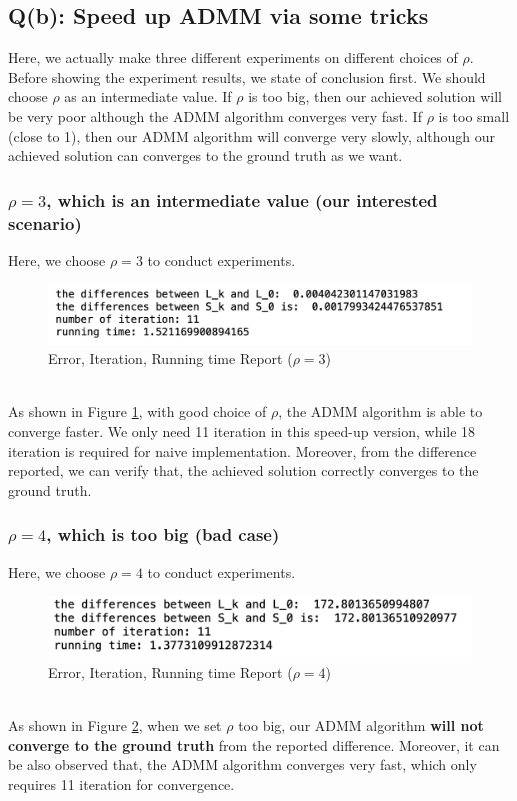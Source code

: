 \documentclass{article}
\begin{document}
\subsection{Q(b): Speed up ADMM via some tricks}
Here, we actually make three different experiments on different choices of $\rho$. Before showing the experiment results, we state of conclusion first. We should choose $\rho$ as an intermediate value. If $\rho$ is too big, then our achieved solution will be very poor although the ADMM algorithm converges very fast. If $\rho$ is too small (close to 1), then our ADMM algorithm will converge very slowly, although our achieved solution can converges to the ground truth as we want.
\subsubsection{$\rho=3$, which is an intermediate value (our interested scenario)}
Here, we choose $\rho=3$ to conduct experiments.
\begin{figure}[h]
	\centering
	\includegraphics[width=.47\textheight]{qb1.png}
	\caption{Error, Iteration, Running time Report ($\rho=3$)}
	\label{fig:qb1}
\end{figure}
\\
As shown in Figure \ref{fig:qb1}, with good choice of $\rho$, the ADMM algorithm is able to converge faster. We only need 11 iteration in this speed-up version, while 18 iteration is required for naive implementation. Moreover, from the difference reported, we can verify that, the achieved solution correctly converges to the ground truth.
\subsubsection{$\rho=4$, which is too big (bad case)}
Here, we choose $\rho=4$ to conduct experiments.
\begin{figure}[h]
	\centering
	\includegraphics[width=.47\textheight]{qb2.png}
	\caption{Error, Iteration, Running time Report ($\rho=4$)}
	\label{fig:qb2}
\end{figure}
\\
As shown in Figure \ref{fig:qb2}, when we set $\rho$ too big, our ADMM algorithm \textbf{will not converge to the ground truth} from the reported difference. Moreover, it can be also observed that, the ADMM algorithm converges very fast, which only requires 11 iteration for convergence.
\end{document}
